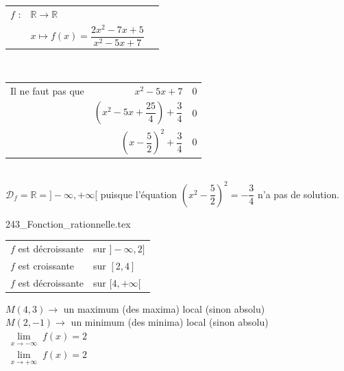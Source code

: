 \begin{tabular}{ll@{$\;$ }l}
 $f$ : & $ \mathbb{R} \longrightarrow \mathbb{R}$\\
       & $ x \longmapsto f(x) = \dfrac{2x^2 -7x +5}{x^2 -5x +7}$ \\
\end{tabular}\\

\begin{tabular}{lr@{$\;=\;$}r}
Il ne faut pas que & $x^2 -5x +7$  & $0$ \\
         & $(x^2 -5x +\dfrac{25}{4}) +\dfrac{3}{4}$& $0$\\
         & $(x -\dfrac{5}{2})^2 +\dfrac{3}{4}$& $0$ 
\end{tabular}\\

$\mathscr{D}_f = \mathbb{R} = ] -\infty, +\infty [ $ puisque l'équation $(x^2 -\dfrac{5}{2})^2 = -\dfrac{3}{4}$ n'a pas de solution.\\


\bigskip 


\centerline{ {243_Fonction_rationnelle.tex} }


\bigskip 



\begin{tabular}{l@{}l}
        $f$ est décroissante & sur $]-\infty, 2]$\\ 
        $f$ est croissante   & sur $[2, 4]$\\
        $f$ est décroissante   & sur $[4,+\infty[$\\    
       \end{tabular}

\smallskip 

$M(4,3) \longrightarrow $ un maximum (des maxima) local (sinon absolu) \\
$M(2,-1) \longrightarrow $ un minimum (des minima) local (sinon absolu)\\

$\lim\limits_{\substack{x \to -\infty}} f(x) = 2 $ \\

$\lim\limits_{\substack{x \to +\infty}} f(x) = 2 $ \\

\begin{center}
\\
\end{center}

